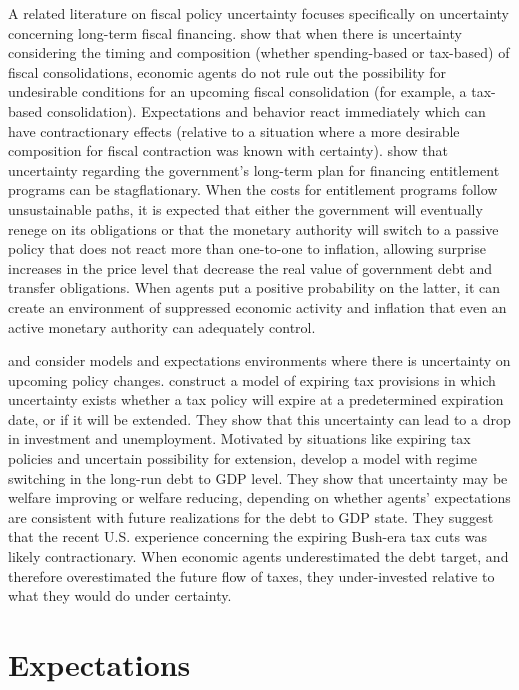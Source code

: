 \documentclass[11pt]{article}
\newcommand{\citee}[1]{\citet{#1}}
\begin{document}
A related literature on fiscal policy uncertainty focuses specifically on uncertainty concerning long-term fiscal financing.  \citee{leeper_ej} show that when there is uncertainty considering the timing and composition (whether spending-based or tax-based) of fiscal consolidations, economic agents do not rule out the possibility for undesirable conditions for an upcoming fiscal consolidation (for example, a tax-based consolidation).  Expectations and behavior react immediately which can have contractionary effects (relative to a situation where a more desirable composition for fiscal contraction was known with certainty).  \citee{davig_leeper_walker} show that uncertainty regarding the government's long-term plan for financing entitlement programs can be stagflationary.  When the costs for entitlement programs follow unsustainable paths, it is expected that either the government will eventually renege on its obligations or that the monetary authority will switch to a passive policy that does not react more than one-to-one to inflation, allowing surprise increases in the price level that decrease the real value of government debt and transfer obligations.  When agents put a positive probability on the latter, it can create an environment of suppressed economic activity and inflation that even an active monetary authority can adequately control.

\citee{richter2013} and \citee{davig2013} consider models and expectations environments where there is uncertainty on upcoming policy changes.  \citee{davig2013} construct a model of expiring tax provisions in which uncertainty exists whether a tax policy will expire at a predetermined expiration date, or if it will be extended.  They show that this uncertainty can lead to a drop in investment and unemployment.  Motivated by situations like expiring tax policies and uncertain possibility for extension, \citee{richter2013} develop a model with regime switching in the long-run debt to GDP level.  They show that uncertainty may be welfare improving or welfare reducing, depending on whether agents' expectations are consistent with future realizations for the debt to GDP state.  They suggest that the recent U.S. experience concerning the expiring Bush-era tax cuts was likely contractionary.  When economic agents underestimated the debt target, and therefore overestimated the future flow of taxes, they under-invested relative to what they would do under certainty.  

\section{Expectations}
\end{document}
